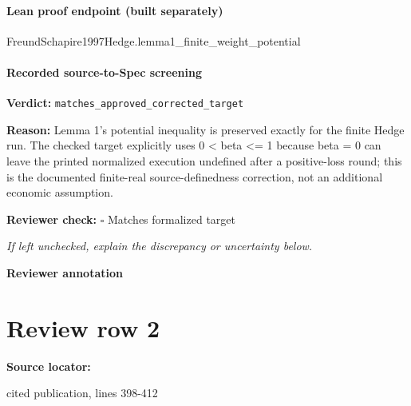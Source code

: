 \documentclass[10pt]{article}
\newcommand{\reviewerbox}{%
  \par\noindent\fbox{\parbox{0.96\linewidth}{\rule{0pt}{0.38in}}}\par
}
\newcommand{\reviewmatch}[1]{%
  \par\noindent\textbf{Reviewer check:} $\square$\; #1\par
  \noindent\emph{If left unchecked, explain the discrepancy or uncertainty below.}\par
}
\begin{document}
\paragraph{Lean proof endpoint (built separately)}\begin{ReviewVerbatim}
FreundSchapire1997Hedge.lemma1_finite_weight_potential
\end{ReviewVerbatim}

\paragraph{Recorded source-to-Spec screening}
\textbf{Verdict:} \texttt{matches\_approved\_corrected\_target}
\\
{\raggedright
\textbf{Reason:} Lemma 1's potential inequality is preserved exactly for the finite Hedge run.\allowbreak{} The checked target explicitly uses 0 < beta <= 1 because beta = 0 can leave the printed normalized execution undefined after a positive-\allowbreak{}loss round;\allowbreak{} this is the documented finite-\allowbreak{}real source-\allowbreak{}definedness correction, not an additional economic assumption.\allowbreak{}
\par}
\reviewmatch{Matches formalized target}
\noindent\textbf{Reviewer annotation}\par
\reviewerbox
\clearpage
\hypertarget{source-claim-8367231b424fe052}{}
\section*{Review row 2}
\textbf{Source locator:} {\footnotesize\raggedright cited publication, lines 398-\allowbreak{}412\par}
\end{document}
